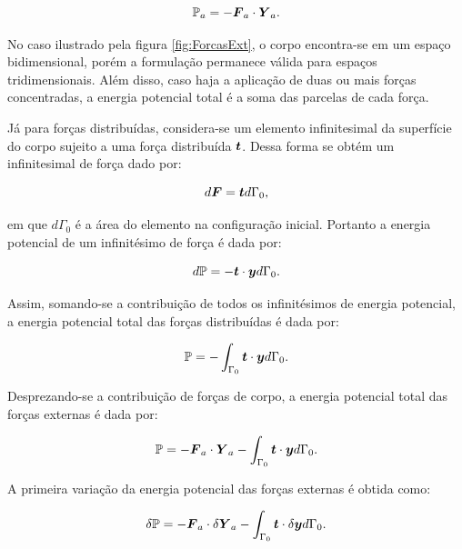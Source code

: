 \begin{equation}
    \mathbb{P}_a=-\boldsymbol{F}_a\cdot\boldsymbol{Y}_a\text{.}
\end{equation}

No caso ilustrado pela figura \ref{fig:ForcasExt}, o corpo encontra-se em um espaço bidimensional, porém a formulação permanece válida para espaços tridimensionais. Além disso, caso haja a aplicação de duas ou mais forças concentradas, a energia potencial total é a soma das parcelas de cada força.

Já para forças distribuídas, considera-se um elemento infinitesimal da superfície do corpo sujeito a uma força distribuída $\boldsymbol{t}$. Dessa forma se obtém um infinitesimal de força dado por:

\begin{equation}
    d\boldsymbol{F}=\boldsymbol{t}d\Gamma_0\text{,}
\end{equation}

\noindent em que $d\Gamma_0$ é a área do elemento na configuração inicial. Portanto a energia potencial de um infinitésimo de força é dada por:

\begin{equation}
    d\mathbb{P}=-\boldsymbol{t}\cdot\boldsymbol{y}d\Gamma_0\text{.}
\end{equation}

Assim, somando-se a contribuição de todos os infinitésimos de energia potencial, a energia potencial total das forças distribuídas é dada por:

\begin{equation}
    \mathbb{P}=-\int_{\Gamma_0}{\boldsymbol{t}\cdot\boldsymbol{y}d\Gamma_0}\text{.}
\end{equation}

Desprezando-se a contribuição de forças de corpo, a energia potencial total das forças externas é dada por:

\begin{equation}
    \mathbb{P}=-\boldsymbol{F}_a\cdot\boldsymbol{Y}_a-\int_{\Gamma_0}{\boldsymbol{t}\cdot\boldsymbol{y}d\Gamma_0}\text{.}
\end{equation}

A primeira variação da energia potencial das forças externas é obtida como:

\begin{equation}
    \delta\mathbb{P}=-\boldsymbol{F}_a\cdot\delta\boldsymbol{Y}_a-\int_{\Gamma_0}{\boldsymbol{t}\cdot\delta\boldsymbol{y}d\Gamma_0}\text{.}
\end{equation}

